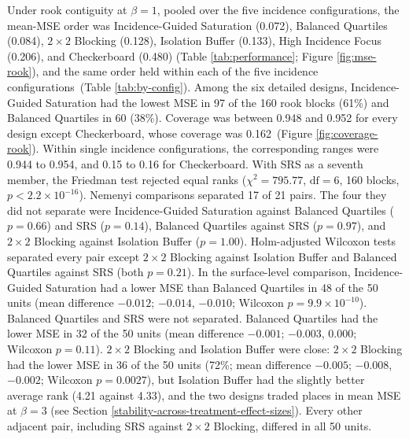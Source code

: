 \documentclass[11pt]{article}
\begin{document}
Under rook contiguity at \(\beta = 1\), pooled over the five incidence
configurations, the mean-MSE order was Incidence-Guided Saturation (0.072), Balanced Quartiles (0.084), \(2\times2\) Blocking
(0.128), Isolation Buffer (0.133), High Incidence Focus (0.206), and
Checkerboard (0.480) (Table \ref{tab:performance}\iffullsi; Figure
\ref{fig:mse-rook}\fi), and the same
order held within each of the five incidence configurations\iffullsi\ (Table
\ref{tab:by-config})\fi. Among the six detailed designs, Incidence-Guided Saturation had the
lowest MSE in 97 of the 160 rook blocks (61\%) and Balanced Quartiles in
60 (38\%). Coverage was between 0.948 and 0.952 for every design except Checkerboard, whose coverage was 0.162\iffullsi\ (Figure \ref{fig:coverage-rook})\fi. Within single incidence
configurations, the corresponding ranges were 0.944 to 0.954, and 0.15 to 0.16 for Checkerboard. \iffullsi
With SRS as a seventh member, the Friedman test rejected equal ranks
(\(\chi^2 = 795.77\), \(\text{df} = 6\), 160 blocks,
\(p < 2.2\times10^{-16}\)). Nemenyi comparisons separated 17 of 21
pairs. The four they did not separate were Incidence-Guided Saturation against Balanced Quartiles (\(p = 0.66\)) and SRS (\(p = 0.14\)), Balanced Quartiles against SRS (\(p = 0.97\)), and \(2\times2\)
Blocking against Isolation Buffer (\(p = 1.00\)). Holm-adjusted Wilcoxon
tests separated every pair except \(2\times2\) Blocking against
Isolation Buffer and Balanced Quartiles against SRS (both \(p = 0.21\)). In the surface-level comparison, Incidence-Guided
Saturation had a lower MSE than Balanced Quartiles in 48 of
the 50 units (mean difference \(-0.012\); \(-0.014\), \(-0.010\);
Wilcoxon \(p = 9.9\times10^{-10}\)). Balanced Quartiles and SRS were not
separated. Balanced Quartiles had the lower MSE in 32 of the 50 units
(mean difference \(-0.001\); \(-0.003\), \(0.000\); Wilcoxon \(p = 0.11\)). \(2\times2\) Blocking and Isolation
Buffer were close: \(2\times2\) Blocking had the lower MSE in 36 of the
50 units (72\%; mean difference \(-0.005\); \(-0.008\), \(-0.002\);
Wilcoxon \(p = 0.0027\)), but Isolation Buffer had the slightly better
average rank (4.21 against 4.33), and the two designs traded places in mean MSE at
\(\beta = 3\) (see Section \ref{stability-across-treatment-effect-sizes}). Every
other adjacent pair, including SRS against \(2\times2\) Blocking, differed in all 50 units.
\fi
\end{document}
